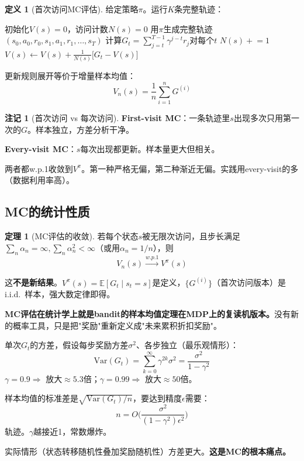 \documentclass[11pt,a4paper]{article}
\theoremstyle{definition}
\newtheorem{definition}{定义}[section]
\newtheorem{theorem}{定理}[section]
\newtheorem{remark}{注记}[section]
\begin{document}
\begin{definition}[首次访问MC评估]
给定策略$\pi$。运行$K$条完整轨迹：
\begin{algorithm}[H]
\caption{First-Visit Monte Carlo评估}
\begin{algorithmic}[1]
\State 初始化$V(s) = 0$，访问计数$N(s) = 0$
    \State 用$\pi$生成完整轨迹$(s_0, a_0, r_0, s_1, a_1, r_1, \ldots, s_T)$
    \State 计算$G_t = \sum_{j=t}^{T-1} \gamma^{j-t} r_j$对每个$t$
        \State $N(s) \mathrel{+}= 1$
        \State $V(s) \leftarrow V(s) + \frac{1}{N(s)}\big[G_t - V(s)\big]$
    \EndFor
\EndFor
\end{algorithmic}
\end{algorithm}

更新规则展开等价于增量样本均值：
\[
V_n(s) = \frac{1}{n}\sum_{i=1}^n G^{(i)}
\]
\end{definition}

\begin{remark}[首次访问 vs 每次访问]
\textbf{First-visit MC}：一条轨迹里$s$出现多次只用第一次的$G$。样本独立，方差分析干净。

\textbf{Every-visit MC}：$s$每次出现都更新。样本量更大但相关。

两者都w.p.1收敛到$V^\pi$。第一种严格无偏，第二种渐近无偏。实践用every-visit的多（数据利用率高）。
\end{remark}

\subsection{MC的统计性质}

\begin{theorem}[MC评估的收敛]
若每个状态$s$被无限次访问，且步长满足$\sum_n \alpha_n = \infty, \sum_n \alpha_n^2 < \infty$（或用$\alpha_n = 1/n$），则
\[
V_n(s) \xrightarrow{w.p.1} V^\pi(s)
\]
\end{theorem}

\begin{proofidea}
这\textbf{不是新结果}。$V^\pi(s) = \mathbb{E}[G_t \mid s_t = s]$是定义，$\{G^{(i)}\}$（首次访问版本）是i.i.d.\ 样本，强大数定律即得。

\textbf{MC评估在统计学上就是bandit的样本均值定理在MDP上的复读机版本。}没有新的概率工具，只是把"奖励"重新定义成"未来累积折扣奖励"。
\end{proofidea}

\begin{calculation}[MC的方差量级]
单次$G_t$的方差，假设每步奖励方差$\sigma^2$、各步独立（最乐观情形）：
\[
\text{Var}(G_t) = \sum_{k=0}^\infty \gamma^{2k}\sigma^2 = \frac{\sigma^2}{1-\gamma^2}
\]
$\gamma=0.9 \Rightarrow$ 放大$\approx 5.3$倍；$\gamma=0.99 \Rightarrow$ 放大$\approx 50$倍。

样本均值的标准差是$\sqrt{\text{Var}(G_t)/n}$，要达到精度$\epsilon$需要：
\[
n = O\Big(\frac{\sigma^2}{(1-\gamma^2)\epsilon^2}\Big)
\]
轨迹。$\gamma$越接近1，常数爆炸。

实际情形（状态转移随机性叠加奖励随机性）方差更大。\textbf{这是MC的根本痛点。}
\end{calculation}
\end{document}
